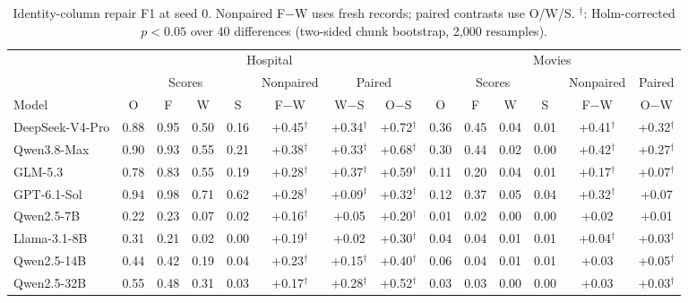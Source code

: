 \begin{table}[t]
  \caption{Identity-column repair F1 at seed 0. Nonpaired F$-$W uses fresh records; paired contrasts
  use O/W/S. $^\dagger$: Holm-corrected $p<0.05$ over 40 differences (two-sided chunk bootstrap,
  2,000 resamples).}
  \label{tab:main}
  \small
  \begin{tabular*}{\textwidth}{@{\extracolsep{\fill}}l cccc ccc cccc cc@{}}
    \toprule
    & \multicolumn{7}{c}{Hospital} & \multicolumn{6}{c}{Movies} \\
    \cmidrule(lr){2-8}\cmidrule(l){9-14}
    & \multicolumn{4}{c}{Scores} & Nonpaired & \multicolumn{2}{c}{Paired} & \multicolumn{4}{c}{Scores} & Nonpaired & Paired \\
    \cmidrule(lr){2-5}\cmidrule(lr){6-6}\cmidrule(lr){7-8}\cmidrule(lr){9-12}\cmidrule(lr){13-13}\cmidrule(l){14-14}
    Model & O & F & W & S & F$-$W & W$-$S & O$-$S & O & F & W & S & F$-$W & O$-$W \\
    \midrule
    DeepSeek-V4-Pro & 0.88 & 0.95 & 0.50 & 0.16 & +0.45$^\dagger$ & +0.34$^\dagger$ & +0.72$^\dagger$ & 0.36 & 0.45 & 0.04 & 0.01 & +0.41$^\dagger$ & +0.32$^\dagger$ \\
    Qwen3.8-Max & 0.90 & 0.93 & 0.55 & 0.21 & +0.38$^\dagger$ & +0.33$^\dagger$ & +0.68$^\dagger$ & 0.30 & 0.44 & 0.02 & 0.00 & +0.42$^\dagger$ & +0.27$^\dagger$ \\
    GLM-5.3 & 0.78 & 0.83 & 0.55 & 0.19 & +0.28$^\dagger$ & +0.37$^\dagger$ & +0.59$^\dagger$ & 0.11 & 0.20 & 0.04 & 0.01 & +0.17$^\dagger$ & +0.07$^\dagger$ \\
    GPT-6.1-Sol & 0.94 & 0.98 & 0.71 & 0.62 & +0.28$^\dagger$ & +0.09$^\dagger$ & +0.32$^\dagger$ & 0.12 & 0.37 & 0.05 & 0.04 & +0.32$^\dagger$ & +0.07 \\
    \midrule
    Qwen2.5-7B & 0.22 & 0.23 & 0.07 & 0.02 & +0.16$^\dagger$ & +0.05 & +0.20$^\dagger$ & 0.01 & 0.02 & 0.00 & 0.00 & +0.02 & +0.01 \\
    Llama-3.1-8B & 0.31 & 0.21 & 0.02 & 0.00 & +0.19$^\dagger$ & +0.02 & +0.30$^\dagger$ & 0.04 & 0.04 & 0.01 & 0.01 & +0.04$^\dagger$ & +0.03$^\dagger$ \\
    Qwen2.5-14B & 0.44 & 0.42 & 0.19 & 0.04 & +0.23$^\dagger$ & +0.15$^\dagger$ & +0.40$^\dagger$ & 0.06 & 0.04 & 0.01 & 0.01 & +0.03 & +0.05$^\dagger$ \\
    Qwen2.5-32B & 0.55 & 0.48 & 0.31 & 0.03 & +0.17$^\dagger$ & +0.28$^\dagger$ & +0.52$^\dagger$ & 0.03 & 0.03 & 0.00 & 0.00 & +0.03 & +0.03$^\dagger$ \\
    \bottomrule
  \end{tabular*}
\end{table}

